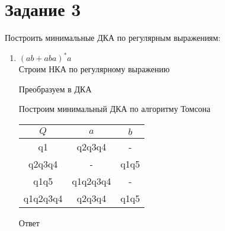 \documentclass{article}
\begin{document}
    \section*{Задание 3}
    Построить минимальные ДКА по регулярным выражениям:
    \begin{enumerate}
    \item \((ab + aba)^{*}a\) \\
    Строим НКА по регулярному выражению
    \begin{center}
            \begin{figure}[htbp]
                \centering
                
            \end{figure}
        \end{center}
    \newpage
    Преобразуем в ДКА 
     \begin{center}
            \begin{figure}[htbp]
                \centering
                
            \end{figure}
        \end{center}
    Построим минимальный ДКА по алгоритму Томсона
     \begin{center}
             \begin{tabular}{ |c|c|c| } 
                \hline
                \(Q\) & \(a\) & \(b\) \\
                \hline\hline
                q1 & q2q3q4 & - \\
                \hline
                q2q3q4 & - & q1q5 \\
                \hline
                q1q5 & q1q2q3q4 & - \\
                \hline
                q1q2q3q4 & q2q3q4 & q1q5 \\
                \hline
            \end{tabular}
        \end{center}
    Ответ
    \begin{center}
            \begin{figure}[htbp]
                \centering
                
            \end{figure}
        \end{center}
        

\end{enumerate}
\end{document}
